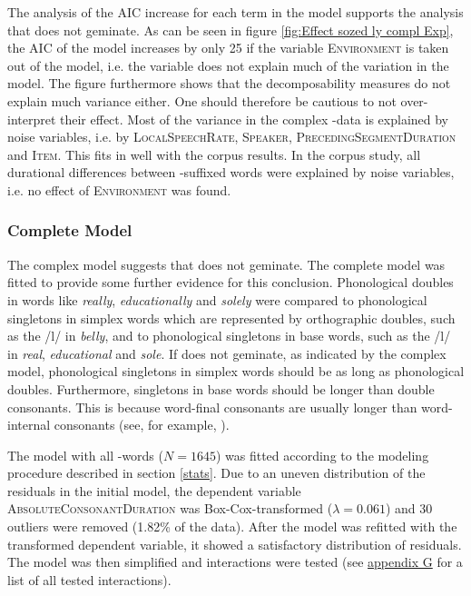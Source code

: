 The analysis of the AIC increase for each term in the model supports the analysis that  does not geminate. As can be seen in figure \ref{fig:Effect sozed ly compl Exp}, the AIC of the model increases by only 25 if the variable \textsc{Environment} is taken out of the model, i.e. the variable does not explain much of the variation in the model.
The figure furthermore shows that the decomposability measures do not explain much variance either. One should therefore be cautious to not over-interpret their effect. 
Most of the variance in the complex -data is explained by noise variables, i.e. by \textsc{LocalSpeechRate}, \textsc{Speaker}, \textsc{PrecedingSegmentDuration} and \textsc{Item}. This fits in well with the corpus results. In the corpus study, all durational differences between -suffixed words were explained by noise variables, i.e. no effect of \textsc{Environment} was found.




\subsubsection{Complete Model}

The complex model suggests that  does not geminate. The complete model was fitted to provide some further evidence for this conclusion. Phonological doubles in words like \textit{really}, \textit{educationally} and \textit{solely} were compared to phonological singletons in simplex words which are represented by orthographic doubles, such as the /l/ in \textit{belly}, and to phonological singletons in base words, such as the /l/ in \textit{real}, \textit{educational} and \textit{sole}. 
If  does not geminate, as indicated by the complex model, phonological singletons in simplex words should be as long as phonological doubles. Furthermore, singletons in base words should be longer than double consonants. This is because word-final consonants are usually longer than word-internal consonants (see, for example,  \citealt{Berkovits.1993,Oller.1973,Umeda.1977}). 


The model with all -words ($N=1645$) was fitted according to the modeling procedure described in section \ref{stats}. Due to an uneven distribution of the residuals in the initial model, the dependent variable \textsc{AbsoluteConsonantDuration} was Box-Cox-transformed ($\lambda = 0.061$) and 30 outliers were removed (1.82\% of the data).
After the model was refitted with the transformed dependent variable, it showed a satisfactory distribution of residuals.  The model was then simplified and interactions were tested (see \hyperref[Appendix G Summaries of tested interactions in experimental study]{appendix G} for a list of all tested interactions).



